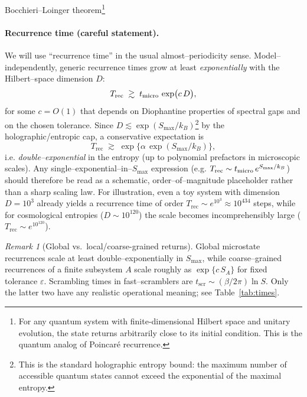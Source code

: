 \documentclass[12pt]{article}
\newcommand{\Smax}{S_{\max}}
\newcommand{\Trec}{T_{\text{rec}}}
\newcommand{\tscr}{t_{\text{scr}}}
\theoremstyle{remark}
\newtheorem{remark}{Remark}
\begin{document}
Bocchieri--Loinger theorem\footnote{For any quantum system with finite-dimensional Hilbert space 
and unitary evolution, the state returns arbitrarily close to its initial condition. 
This is the quantum analog of Poincaré recurrence.}



\paragraph{Recurrence time (careful statement).}
We will use “recurrence time” in the usual almost–periodicity sense. Model–independently, generic recurrence times grow at least \emph{exponentially} with the Hilbert–space dimension $D$:
\[
\Trec \;\gtrsim\; t_{\rm micro}\,\exp\!\big(c\,D\big),
\]
for some $c=O(1)$ that depends on Diophantine properties of spectral gaps and on the chosen tolerance.
Since $D \lesssim \exp(\Smax/k_B)$\footnote{This is the standard holographic entropy bound: the maximum number of accessible quantum states cannot exceed the exponential of the maximal entropy.} by the holographic/entropic cap, a conservative expectation is
\[
\Trec \;\gtrsim\; \exp\!\Big\{\alpha\,\exp(\Smax/k_B)\Big\},
\]
i.e. \emph{double–exponential} in the entropy (up to polynomial prefactors in microscopic scales).
Any single–exponential–in–$\Smax$ expression (e.g. $\Trec\sim t_{\rm micro}\,e^{\Smax/k_B}$) should therefore be read as a schematic, order–of–magnitude placeholder rather than a sharp scaling law. For illustration, even a toy system with dimension $D=10^3$ already yields a 
recurrence time of order $T_{\text{rec}} \sim e^{10^3} \approx 10^{434}$ steps, 
while for cosmological entropies ($D \sim 10^{120}$) the scale becomes 
incomprehensibly large ($T_{\text{rec}} \sim e^{10^{120}}$).


\begin{remark}[Global vs.\ local/coarse-grained returns]\label{rem:times}
Global microstate recurrences scale at least double–exponentially in $\Smax$, 
while coarse–grained recurrences of a finite subsystem $A$ scale roughly as 
$\exp\{c\,S_A\}$ for fixed tolerance $\varepsilon$. 
Scrambling times in fast–scramblers are $\tscr\sim (\beta/2\pi)\ln S$.
Only the latter two have any realistic operational meaning; see Table~\ref{tab:times}.
\end{remark}
\end{document}
